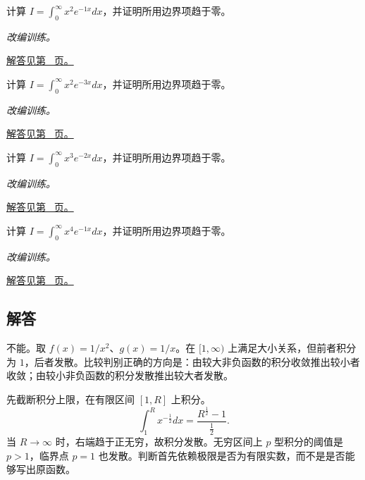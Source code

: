 \documentclass[UTF8,12pt,a4paper,fontset=fandol]{ctexart}
\begin{document}
\begin{example}[指数衰减积分的递推]\label{ex:c19q22}
计算 $I=\displaystyle\int_0^\infty x^{2}e^{-1x}dx$，并证明所用边界项趋于零。
\par\textit{改编训练。}\par\hyperref[ans:c19q22]{解答见第~\pageref{ans:c19q22} 页。}
\end{example}
\begin{example}[指数衰减积分的递推]\label{ex:c19q23}
计算 $I=\displaystyle\int_0^\infty x^{2}e^{-3x}dx$，并证明所用边界项趋于零。
\par\textit{改编训练。}\par\hyperref[ans:c19q23]{解答见第~\pageref{ans:c19q23} 页。}
\end{example}
\begin{example}[指数衰减积分的递推]\label{ex:c19q24}
计算 $I=\displaystyle\int_0^\infty x^{3}e^{-2x}dx$，并证明所用边界项趋于零。
\par\textit{改编训练。}\par\hyperref[ans:c19q24]{解答见第~\pageref{ans:c19q24} 页。}
\end{example}
\begin{example}[指数衰减积分的递推]\label{ex:c19q25}
计算 $I=\displaystyle\int_0^\infty x^{4}e^{-1x}dx$，并证明所用边界项趋于零。
\par\textit{改编训练。}\par\hyperref[ans:c19q25]{解答见第~\pageref{ans:c19q25} 页。}
\end{example}
\subsection{解答}
\begin{solve}\label{ans:c19q1}
不能。取 $f(x)=1/x^2$、$g(x)=1/x$。在 $[1,\infty)$ 上满足大小关系，但前者积分为 $1$，后者发散。比较判别正确的方向是：由较大非负函数的积分收敛推出较小者收敛；由较小非负函数的积分发散推出较大者发散。
\end{solve}

\begin{solve}\label{ans:c19q2}
先截断积分上限，在有限区间 $[1,R]$ 上积分。
\[
\int_1^Rx^{-\frac{1}{2}}dx=\frac{R^{\frac{1}{2}}-1}{\frac{1}{2}}.
\]
当 $R\to\infty$ 时，右端趋于正无穷，故积分发散。无穷区间上 $p$ 型积分的阈值是 $p>1$，临界点 $p=1$ 也发散。判断首先依赖极限是否为有限实数，而不是是否能够写出原函数。
\end{solve}
\end{document}
